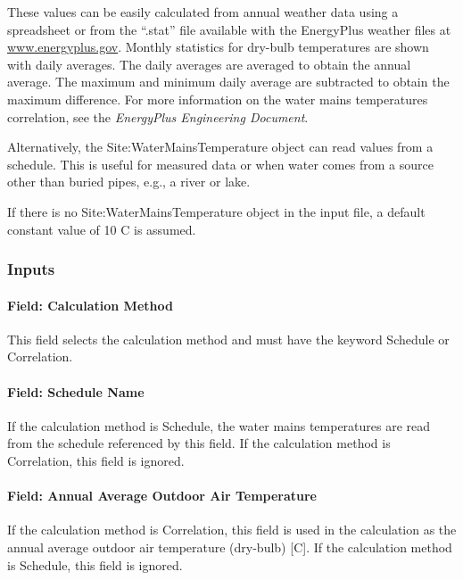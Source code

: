 These values can be easily calculated from annual weather data using a spreadsheet or from the ``.stat'' file available with the EnergyPlus weather files at \href{http://www.energyplus.gov}{www.energyplus.gov}. Monthly statistics for dry-bulb temperatures are shown with daily averages. The daily averages are averaged to obtain the annual average. The maximum and minimum daily average are subtracted to obtain the maximum difference. For more information on the water mains temperatures correlation, see the \emph{EnergyPlus Engineering Document}.

Alternatively, the Site:WaterMainsTemperature object can read values from a schedule. This is useful for measured data or when water comes from a source other than buried pipes, e.g., a river or lake.

If there is no Site:WaterMainsTemperature object in the input file, a default constant value of 10 C is assumed.

\subsubsection{Inputs}\label{inputs-21-003}

\paragraph{Field: Calculation Method}\label{field-calculation-method}

This field selects the calculation method and must have the keyword Schedule or Correlation.

\paragraph{Field: Schedule Name}\label{field-schedule-name-003}

If the calculation method is Schedule, the water mains temperatures are read from the schedule referenced by this field. If the calculation method is Correlation, this field is ignored.

\paragraph{Field: Annual Average Outdoor Air Temperature}\label{field-annual-average-outdoor-air-temperature}

If the calculation method is Correlation, this field is used in the calculation as the annual average outdoor air temperature (dry-bulb) {[}C{]}. If the calculation method is Schedule, this field is ignored.


